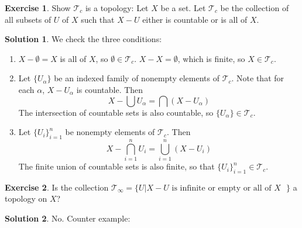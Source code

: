 \documentclass[12pt]{article}
\theoremstyle{plain}
\theoremstyle{definition}
\newtheorem*{solution}{\color{Goldenrod}Solution}
\newtheorem{exercise}{\color{YellowOrange}Exercise}[section]
\newcommand{\1}{\mathbbm 1}
\newcommand{\tT}{\mathcal T}
\begin{document}
\begin{exercise}
	Show $\tT_c$ is a topology: Let $X$ be a set. Let $\tT_c$ be the collection of all subsets of $U$ of $X$ such that $X-U$ either is countable or is all of $X$. 
\end{exercise}
\begin{solution}
	We check the three conditions:
	\begin{enumerate}
		\item $X - \emptyset = X$ is all of $X$, so $\emptyset \in \tT_c$. $X - X = \emptyset$, which is finite, so $X \in \tT_c$.
		\item Let $\{U_\alpha\}$ be an indexed family of nonempty elements of $\tT_c$. Note that for each $\alpha$, $X - U_\alpha$ is countable. Then
		\begin{equation}
			X - \bigcup U_\alpha = \bigcap (X - U_\alpha)
		\end{equation}
		The intersection of countable sets is also countable, so $\{U_\alpha\} \in \tT_c$.
		\item Let $\{U_i\}_{i=1}^n$ be nonempty elements of $\tT_c$. Then
		\begin{equation}
			X - \bigcap_{i=1}^n U_i = \bigcup_{i=1}^n (X - U_i)
		\end{equation}
		The finite union of countable sets is also finite, so that $\{U_i\}_{i=1}^n \in \tT_c$.
	\end{enumerate}
\end{solution}

\begin{exercise}
	Is the collection $\tT_\infty = \{U | X-U \text{ is infinite or empty or all of $X$ } \}$ a topology on $X$?
\end{exercise}
\begin{solution}
	No. Counter example: 
\end{solution}
\end{document}
